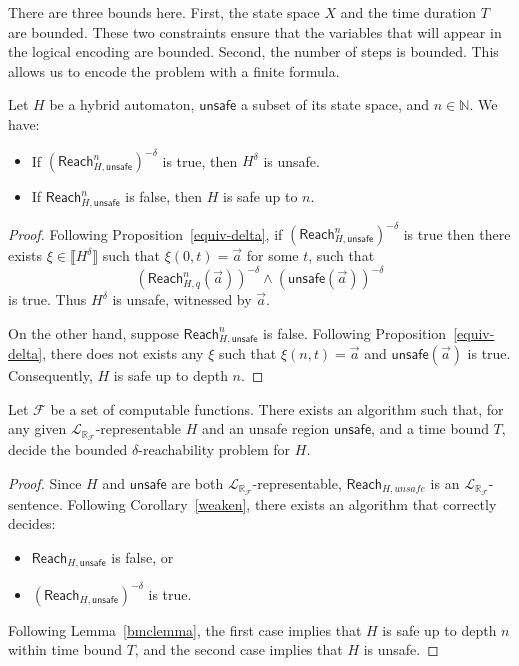 \documentclass[envcountsect]{llncs}
\newcommand{\reach}{\mathsf{Reach}}
\newcommand{\unsafe}{\mathsf{unsafe}}
\newcommand{\lrf}{\mathcal{L}_{\mathbb{R}_{\mathcal{F}}}}
\begin{document}
\begin{remark}
There are three bounds here. First, the state space $X$ and the time duration $T$ are bounded. These two constraints ensure that the variables that will appear in the logical encoding are bounded. Second, the number of steps is bounded. This allows us to encode the problem with a finite formula. 
\end{remark}


\begin{lemma}\label{bmclemma}
Let $H$ be a hybrid automaton, $\unsafe$ a subset of its state space, and $n\in\mathbb{N}$. We have:
\begin{itemize}
\item If $(\reach^n_{H,\unsafe})^{-\delta}$ is true, then $H^{\delta}$ is unsafe. 
\item If $\reach^n_{H,\unsafe}$ is false, then $H$ is safe up to $n$. 
\end{itemize}
\end{lemma}

\begin{proof}
Following Proposition~\ref{equiv-delta}, if $(\reach^n_{H,\unsafe})^{-\delta}$ is true then there exists $\xi\in \llbracket H^{\delta}\rrbracket$ such that $\xi(0,t)=\vec a$ for some $t$, such that 
$$(\reach^n_{H,q}(\vec a))^{-\delta} \wedge (\unsafe(\vec a))^{-\delta}$$
is true. Thus $H^{\delta}$ is unsafe, witnessed by $\vec a$. 

On the other hand, suppose $\reach^n_{H,\unsafe}$ is false. Following Proposition~\ref{equiv-delta}, there does not exists any $\xi$ such that $\xi(n,t) = \vec a$ and $\unsafe(\vec a)$ is true. Consequently, $H$ is safe up to depth $n$. 
\end{proof}




\begin{theorem}
Let $\mathcal{F}$ be a set of computable functions. There exists an algorithm such that, for any given $\lrf$-representable $H$ and an unsafe region $\unsafe$, and a time bound $T$, decide the bounded $\delta$-reachability problem for $H$.  
\end{theorem}

\begin{proof}
Since $H$ and $\unsafe$ are both $\lrf$-representable, $\reach_{H,unsafe}$ is an $\lrf$-sentence. Following Corollary~\ref{weaken}, there exists an algorithm that correctly decides:
\begin{itemize}
\item $\reach_{H,\unsafe}$ is false, or
\item $(\reach_{H,\unsafe})^{-\delta}$ is true. 
\end{itemize}
Following Lemma~\ref{bmclemma}, the first case implies that $H$ is safe up to depth $n$ within time bound $T$, and the second case implies that $H$ is unsafe. 
\end{proof}
\end{document}
